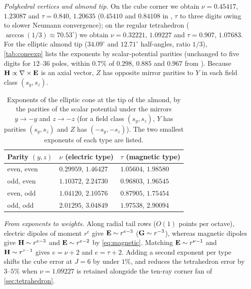 \emph{Polyhedral vertices and almond tip.} On the cube corner we obtain $\nu = 0.45417$, $1.23087$ and $\tau = 0.840$, $1.20635$ ($0.45410$ and $0.84108$ in \cite{desmedt1986}, $\tau$ to three digits owing to slower Neumann convergence); on the regular tetrahedron ($\arccos(1/3)\approx 70.53^\circ$) we obtain $\nu = 0.32221$, $1.09227$ and $\tau = 0.907$, $1.07683$. For the elliptic almond tip ($34.09^\circ$ and $12.71^\circ$ half-angles, ratio $1/3$), \autoref{tab:coneexp} lists the exponents by scalar-potential parities (unchanged to five digits for $12\text{--}36$ poles, within $0.7\%$ of $0.298$, $0.885$ and $0.967$ from \cite{desmedt1986}). Because $\mathbf{H}\propto\nabla\times\mathbf{E}$ is an axial vector, $Z$ has opposite mirror parities to $Y$ in each field class $(s_y,s_z)$.

\begin{table}[htbp]
  \centering
  \caption{Exponents of the elliptic cone at the tip of the almond, by the parities of the scalar potential under the mirrors $y\to-y$ and $z\to-z$ (for a field class $(s_y,s_z)$, $Y$ has parities $(s_y,s_z)$ and $Z$ has $(-s_y,-s_z)$). The two smallest exponents of each type are listed.}
  \label{tab:coneexp}
  \begin{tabular}{lll}
    \toprule
    Parity $(y,z)$ & $\nu$ (electric type) & $\tau$ (magnetic type) \\
    \midrule
    even, even & $0.29959$, $1.46427$ & $1.05604$, $1.98580$ \\
    odd, even  & $1.10372$, $2.24730$ & $0.96803$, $1.96545$ \\
    even, odd  & $1.04120$, $2.10576$ & $0.87905$, $1.75454$ \\
    odd, odd   & $2.01295$, $3.04849$ & $1.97538$, $2.90094$ \\
    \bottomrule
  \end{tabular}
\end{table}

\emph{From exponents to weights.} Along radial tail rows ($O(1)$ points per octave), electric dipoles of moment $r^{e}$ give $\mathbf{E}\sim r^{e-3}$ ($\mathbf{G}\sim r^{-3}$), whereas magnetic dipoles give $\mathbf{H}\sim r^{e-3}$ and $\mathbf{E}\sim r^{e-2}$ by \eqref{eq:magnetic}. Matching $\mathbf{E}\sim r^{\nu-1}$ and $\mathbf{H}\sim r^{\tau-1}$ gives $e = \nu+2$ and $e = \tau+2$. Adding a second exponent per type shifts the cube error at $J = 6$ by under $1\%$, and reduces the tetrahedron error by $3\text{--}5\%$ when $\nu = 1.09227$ is retained alongside the ten-ray corner fan of \autoref{sec:tetrahedron}.

